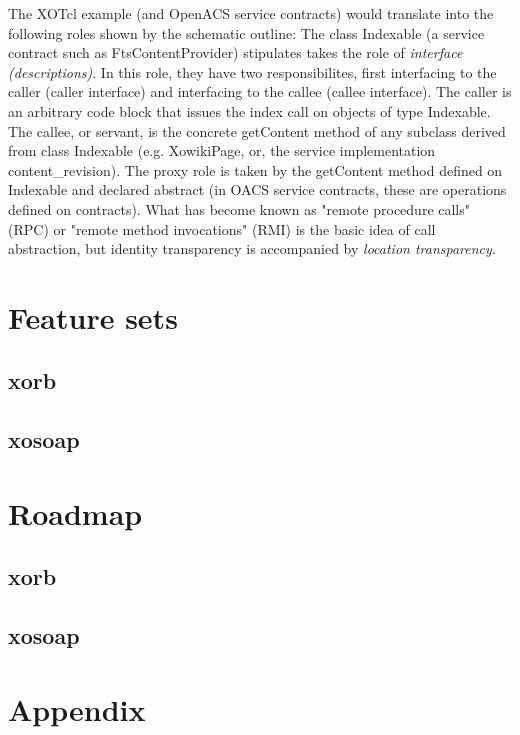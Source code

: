 The XOTcl example (and OpenACS service contracts) would translate into the following roles shown by the schematic outline: The class Indexable (a service contract such as FtsContentProvider) stipulates takes the role of \emph{interface (descriptions)}. In this role, they have two responsibilites, first interfacing to the caller (caller interface) and interfacing to the callee (callee interface). The caller is an arbitrary code block that issues the index call on objects of type Indexable. The callee, or servant, is the concrete getContent method of any subclass derived from class Indexable (e.g. XowikiPage, or, the service implementation content\_revision). The proxy role is taken by the getContent method defined on Indexable and declared abstract (in OACS service contracts, these are operations defined on contracts).
What has become known as "remote procedure calls" (RPC) or "remote method invocations" (RMI) is the basic idea of call abstraction, but identity transparency is accompanied by \emph{location transparency}.

  \section{Feature sets}
  \subsection{xorb}
  \subsection{xosoap}
  \section{Roadmap}
   \subsection{xorb}	
  \subsection{xosoap}
  \section{Appendix} 
